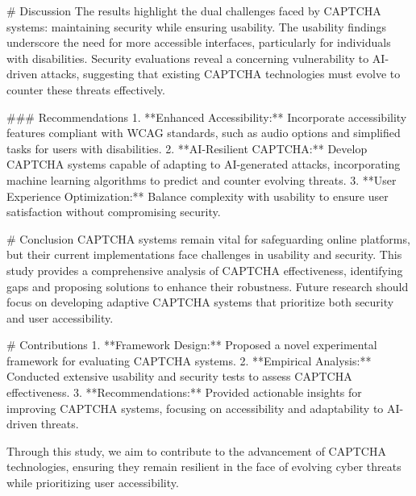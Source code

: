 # Discussion  
The results highlight the dual challenges faced by CAPTCHA systems: maintaining security while ensuring usability. The usability findings underscore the need for more accessible interfaces, particularly for individuals with disabilities. Security evaluations reveal a concerning vulnerability to AI-driven attacks, suggesting that existing CAPTCHA technologies must evolve to counter these threats effectively.  

### Recommendations  
1. **Enhanced Accessibility:** Incorporate accessibility features compliant with WCAG standards, such as audio options and simplified tasks for users with disabilities.  
2. **AI-Resilient CAPTCHA:** Develop CAPTCHA systems capable of adapting to AI-generated attacks, incorporating machine learning algorithms to predict and counter evolving threats.  
3. **User Experience Optimization:** Balance complexity with usability to ensure user satisfaction without compromising security.

# Conclusion  
CAPTCHA systems remain vital for safeguarding online platforms, but their current implementations face challenges in usability and security. This study provides a comprehensive analysis of CAPTCHA effectiveness, identifying gaps and proposing solutions to enhance their robustness. Future research should focus on developing adaptive CAPTCHA systems that prioritize both security and user accessibility.

# Contributions  
1. **Framework Design:** Proposed a novel experimental framework for evaluating CAPTCHA systems.  
2. **Empirical Analysis:** Conducted extensive usability and security tests to assess CAPTCHA effectiveness.  
3. **Recommendations:** Provided actionable insights for improving CAPTCHA systems, focusing on accessibility and adaptability to AI-driven threats.  

Through this study, we aim to contribute to the advancement of CAPTCHA technologies, ensuring they remain resilient in the face of evolving cyber threats while prioritizing user accessibility.
